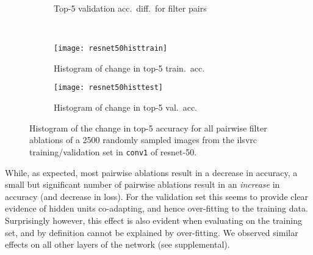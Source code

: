 \documentclass[thesis]{subfiles}
\begin{document}
\begin{figure}[tbp]
\begin{subfigure}[b]{0.33\textheight}
\caption{Top-5 validation acc.~diff.~for filter pairs}
\label{fig:resnet50ablation_conv1_top5_test_hist}
\end{subfigure}\\
\begin{subfigure}[c]{0.47\textwidth}
\centering
\texttt{[image: resnet50histtrain]}
\caption{Histogram of change in top-5 train.~acc.}
\label{fig:resnet50ablation_conv1_top5_train}
\end{subfigure}
\begin{subfigure}[c]{0.47\textwidth}
\centering
\texttt{[image: resnet50histtest]}
\caption{Histogram of change in top-5 val.~acc.}
\label{fig:resnet50ablation_conv1_top5_test}
\end{subfigure}

%
\caption[Pairwise filter ablations in ResNet 50]{Histogram of the change in top-5 accuracy for all pairwise filter ablations of a 2500 randomly sampled images from the \gls{ilsvrc} training/validation set in \texttt{conv1} of \gls{resnet}-50.}
\label{fig:resnet50ablation_conv1_top5}
\end{figure}

While, as expected, most pairwise ablations result in a decrease in accuracy, a small but significant number of pairwise ablations result in an \emph{increase} in accuracy (and decrease in loss). For the validation set this seems to provide clear evidence of hidden units co-adapting, and hence over-fitting to the training data. Surprisingly however, this effect is also evident when evaluating on the training set, and by definition cannot be explained by over-fitting. We observed similar effects on all other layers of the network (see supplemental).
\end{document}

